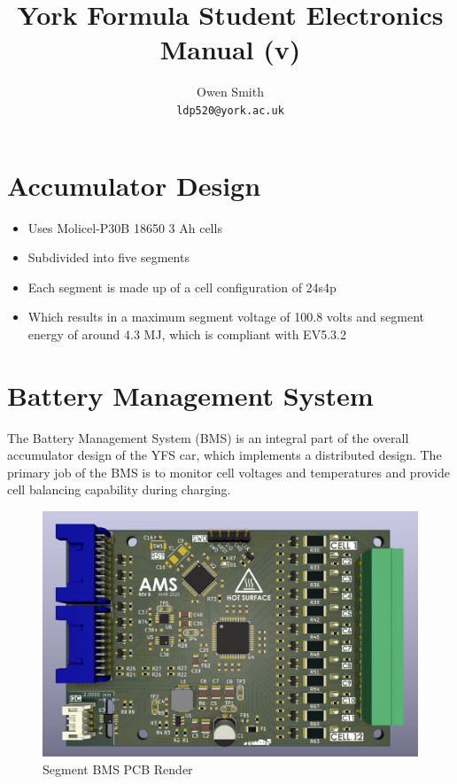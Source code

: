 \documentclass[12pt]{article}
\title{York Formula Student Electronics Manual (v\vhCurrentVersion)}
\date{\vhCurrentDate}
\author{
  Owen Smith\\
  \texttt{ldp520@york.ac.uk}
}
\begin{document}
\maketitle
\tableofcontents

\section{Accumulator Design}

\begin{itemize}
\item Uses Molicel-P30B 18650 3 Ah cells
\item Subdivided into five segments
\item Each segment is made up of a cell configuration of 24s4p
\item Which results in a maximum segment voltage of 100.8 volts and segment energy of around 4.3 MJ, which is compliant with EV5.3.2
\end{itemize}

\section{Battery Management System}
The Battery Management System (BMS) is an integral part of the overall accumulator design of the YFS car, which implements a distributed design.
The primary job of the BMS is to monitor cell voltages and temperatures and provide cell balancing capability during charging.

\begin{figure}[H]
  \centering
  \includegraphics[width=\linewidth]{bms.png}
  \caption{Segment BMS PCB Render}
  \label{fig:bms-pcb}
\end{figure}
\end{document}
